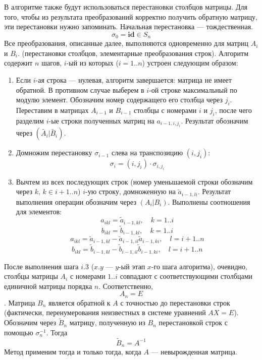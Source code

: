 \documentclass[12pt, russian]{article}
\begin{document}
В алгоритме также будут использоваться перестановки столбцов матрицы. Для того, чтобы из результата преобразований корректно получить обратную матрицу, эти перестановки нужно запоминать. Начальная перестановка --- тождественная.
$$ \sigma_0 = \textbf{id} \in S_n $$
Все преобразования, описанные далее, выполняются одновременно для матриц $A_i$ и $B_i$. (перестановки столбцов, элементарные преобразования строк).
Алгоритм содержит $n$ шагов, $i$-ый из которых ($i=1..n$) устроен следующим образом:
\begin{enumerate}

\item Если $i$-ая строка --- нулевая, алгоритм завершается: матрица не имеет обратной. В противном случае выберем в $i$-ой строке максимальный по модулю элемент. Обозначим номер содержащего его столбца через $j_i$. Переставим в матрицах $A_{i-1}$ и $B_{i-1}$ столбцы с номерами $i$ и $j_i$, после чего разделим $i$-ые строки полученных матриц на $a_{i-1,i,j_i}$. Результат обозначим через $(\tilde{A_i}|\tilde{B_i})$.

\item Домножим перестановку $\sigma_{i-1}$ слева на транспозицию $(i,j_i)$:
$$ \sigma_i = (i,j_i) \cdot \sigma_{i,j_i} $$

\item Вычтем из всех последующих строк (номер уменьшаемой строки обозначим через $k,\,k\in i+1..n$) $i$-ую строку, домноженную на $\tilde{a}_{i-1,li}$. Результат выполнения операции обозначим через $(A_i|B_i)$. Выполнены соотношения для элементов:
\pagebreak
$$ a_{ikl} = \tilde{a}_{i-1,kl},\quad k=1..i $$
$$ b_{ikl} = \tilde{b}_{i-1,kl},\quad k=1..i $$
$$ a_{ikl} = \tilde{a}_{i-1,kl} - \tilde{a}_{i-1,il}\tilde{a}_{i-1,ki},\quad l=i+1..n $$
$$ b_{ikl} = \tilde{b}_{i-1,kl} - \tilde{b}_{i-1,il}\tilde{b}_{i-1,ki},\quad l=i+1..n $$ 

\end{enumerate}

После выполнения шага $i.3$ ($x.y$ --- $y$-ый этап $x$-го шага алгоритма), очевидно, столбцы матрицы $A_i$ с номерами $1..i$ совпадают с соответствующими столбцами единичной матрицы порядка $n$. Соответственно, $$A_n = E$$. Матрица $B_n$ является обратной к $A$ с точностью до перестановки строк (фактически, перенумерования неизвестных в системе уравнений $AX=E$). Обозначим через $\tilde{B}_n$ матрицу, полученную из $B_n$ перестановкой строк с помощью $\sigma_n^{-1}$. Тогда
$$ \tilde{B}_n = A^{-1} $$
Метод применим тогда и только тогда, когда $A$ --- невырожденная матрица.
\end{document}
